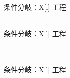 \clearpage

\begin{multicollongtblr}{条件分岐：\PMEndFaceBoringExists}{X[l]}
工程\\
\EndFaceBoringMilling\\
\end{multicollongtblr}

\begin{multicollongtblr}{条件分岐：\PMIncutBoringExists}{X[l]}
工程\\
\IncutBoringMilling\\
\TopEndFaceInChamferMilling\\
\end{multicollongtblr}

\begin{multicollongtblr}{条件分岐：\PMCurvedOutcutExists}{X[l]}
工程\\
\CurvedOutcutMilling\\
\EndFaceOutChamferMilling\\
\end{multicollongtblr}
